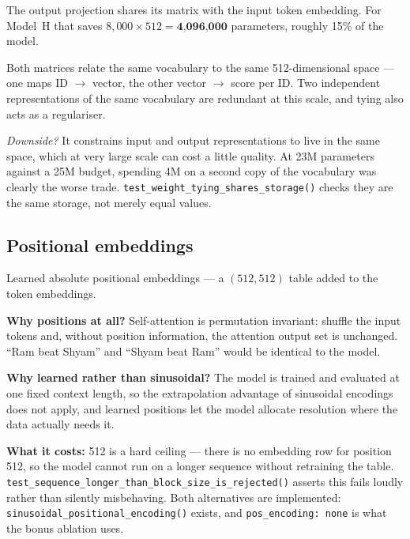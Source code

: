 \documentclass[11pt]{report}
\begin{document}
\begin{shortans}
The output projection shares its matrix with the input token embedding. For
Model~H that saves $8{,}000 \times 512 = \textbf{4,096,000}$ parameters, roughly
15\% of the model.
\end{shortans}

\begin{deeper}
Both matrices relate the same vocabulary to the same 512-dimensional space ---
one maps ID $\rightarrow$ vector, the other vector $\rightarrow$ score per ID.
Two independent representations of the same vocabulary are redundant at this
scale, and tying also acts as a regulariser.

\medskip
\textit{Downside?} It constrains input and output representations to live in
the same space, which at very large scale can cost a little quality. At 23M
parameters against a 25M budget, spending 4M on a second copy of the vocabulary
was clearly the worse trade. \texttt{test\_weight\_tying\_shares\_storage()}
checks they are the same storage, not merely equal values.
\end{deeper}

\subsection{Positional embeddings}

\begin{shortans}
Learned absolute positional embeddings --- a $(512, 512)$ table added to the
token embeddings.
\end{shortans}

\begin{deeper}
\textbf{Why positions at all?} Self-attention is permutation invariant: shuffle
the input tokens and, without position information, the attention output set is
unchanged. ``Ram beat Shyam'' and ``Shyam beat Ram'' would be identical to the
model.

\medskip
\textbf{Why learned rather than sinusoidal?} The model is trained and evaluated
at one fixed context length, so the extrapolation advantage of sinusoidal
encodings does not apply, and learned positions let the model allocate
resolution where the data actually needs it.

\medskip
\textbf{What it costs:} 512 is a hard ceiling --- there is no embedding row for
position 512, so the model cannot run on a longer sequence without retraining
the table.
\texttt{test\_sequence\_longer\_than\_block\_size\_is\_rejected()} asserts this
fails loudly rather than silently misbehaving. Both alternatives are
implemented: \texttt{sinusoidal\_positional\_encoding()} exists, and
\texttt{pos\_encoding: none} is what the bonus ablation uses.
\end{deeper}
\end{document}
